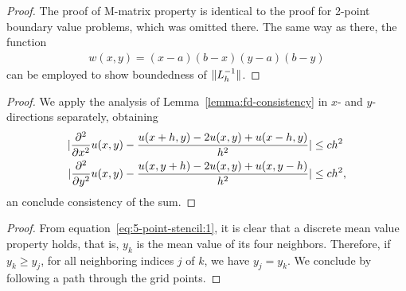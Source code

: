 \begin{proof}
  The proof of M-matrix property is identical to the proof for 2-point
  boundary value problems, which was omitted there.  The same way as
  there, the function
  \begin{gather*}
    w(x,y) = (x-a)(b-x)(y-a)(b-y)
  \end{gather*}
  can be employed to show boundedness of $\lVert L_h^{-1}\rVert$.
\end{proof}



\begin{proof}
  We apply the analysis of Lemma~\ref{lemma:fd-consistency} in $x$-
  and $y$-directions separately, obtaining
  \begin{align*}
    \lvert\frac{\partial^2}{\partial x^2} u(x,y)
      - \frac{u(x+h,y) -2u(x,y) + u(x-h,y)}{h^2}\rvert & \le c h^2 \\
    \lvert\frac{\partial^2}{\partial y^2} u(x,y)
      - \frac{u(x,y+h) -2u(x,y) + u(x,y-h)}{h^2}\rvert & \le c h^2,
  \end{align*}
  an conclude consistency of the sum.
\end{proof}



\begin{proof}
  From equation~\eqref{eq:5-point-stencil:1}, it is clear that a
  discrete mean value property holds, that is, $y_k$ is the mean value
  of its four neighbors. Therefore, if $y_k \ge y_j$, for all
  neighboring indices $j$ of $k$, we have $y_j = y_k$. We conclude by
  following a path through the grid points.
\end{proof}

